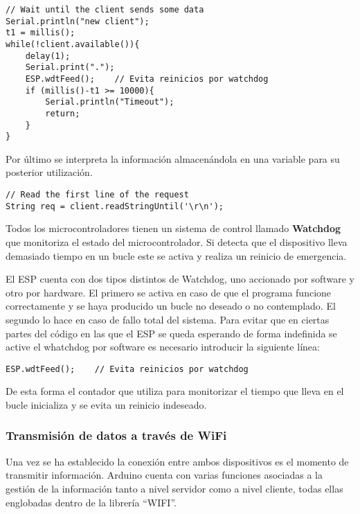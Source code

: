 \begin{lstlisting}[label=algoritmo:ESP_Server_handler_2,style = STM-code,frame=single,caption=Gestión de clientes y peticiones en Arduino]
// Wait until the client sends some data
Serial.println("new client");
t1 = millis();
while(!client.available()){
	delay(1);
	Serial.print(".");
	ESP.wdtFeed();    // Evita reinicios por watchdog
	if (millis()-t1 >= 10000){
		Serial.println("Timeout");
		return;
	}
}
\end{lstlisting}

Por último se interpreta la información almacenándola en una variable para su posterior utilización.

\begin{lstlisting}[label=algoritmo:ESP_Server_handler_2,style = STM-code,frame=single,caption=Gestión de clientes y peticiones en Arduino]
// Read the first line of the request
String req = client.readStringUntil('\r\n');
\end{lstlisting}

Todos los microcontroladores tienen un sistema de control llamado \textbf{Watchdog} que monitoriza el estado del microcontrolador. Si detecta que el dispositivo lleva demasiado tiempo en un bucle este se activa y realiza un reinicio de emergencia. 

El ESP cuenta con dos tipos distintos de Watchdog, uno accionado por software y otro por hardware. El primero se activa en caso de que el programa funcione correctamente y se haya producido un bucle no deseado o no contemplado. El segundo lo hace en caso de fallo total del sistema. Para evitar que en ciertas partes del código en las que el ESP se queda esperando de forma indefinida se active el whatchdog por software es necesario introducir la siguiente línea:
\begin{lstlisting}[label=algoritmo:ESP_Server_wdt,style = STM-code,frame=single,caption=Reinicios por \textit{watchdog}]
ESP.wdtFeed();    // Evita reinicios por watchdog
\end{lstlisting}
De esta forma el contador que utiliza para monitorizar el tiempo que lleva en el bucle inicializa y se evita un reinicio indeseado.

\subsubsection{Transmisión de datos a través de WiFi\label{sec:Software_Arduino_Com_WiFi}}

Una vez se ha establecido la conexión entre ambos dispositivos es el momento de transmitir información. Arduino cuenta con varias funciones asociadas a la gestión de la información tanto a nivel servidor como a nivel cliente, todas ellas englobadas dentro de la librería ``WIFI''.

